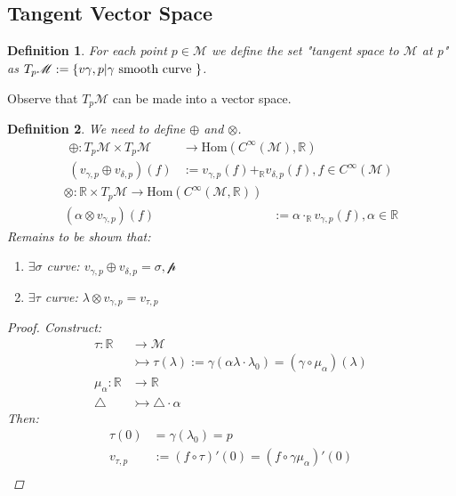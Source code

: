 \documentclass[10pt, oneside]{article}
\newcommand{\R}{\mathbb{R}}
\newcommand{\M}{\mathcal{M}}
\newtheorem{defn}{Definition}
\begin{document}
  \subsection{Tangent Vector Space}
     \begin{defn}
        For each point $p \in \M$ we define the set "tangent space to $\M$ at p" as $\\T_p \M := \{v{\gamma,p} | \gamma \text{ smooth curve } \}$.
     \end{defn}
     Observe that $T_p \M$ can be made into a vector space.
     \begin{defn}
        We need to define $\oplus$ and $\otimes$.
        \begin{align*}
           \oplus: T_p \M \times T_p \M &\to \text{Hom}(C^\infty(\M),\R) \\
           (v_{\gamma,p} \oplus v_{\delta,p})(f) &:= v_{\gamma,p}(f) +_{\R} v_{\delta,p} (f), f \in C^\infty (\M)
        \end{align*}
        \begin{align*}
           \otimes: \R \times T_p \M \to \text{Hom}(C^\infty(\M,\R)) \\
           (\alpha \otimes v_{\gamma,p})(f) &:= \alpha \cdot_{\R} v_{\gamma,p} (f), \alpha \in \R
        \end{align*}
        Remains to be shown that:
        \begin{enumerate}
           \item $\exists \sigma$ curve: $v_{\gamma,p} \oplus v_{\delta,p} = \mathcal{\sigma,p}$
           \item $\exists \tau$ curve: $\lambda \otimes v_{\gamma,p} = v_{\tau,p}$
        \end{enumerate}
        \begin{proof}
           Construct:
           \begin{align*}
              \tau: \R &\to \M \\
              &\rightarrowtail \tau(\lambda) := \gamma(\alpha \lambda \cdot \lambda_0) = (\gamma \circ \mu_{\alpha})(\lambda) \\
              \mu_\alpha: \R &\to \R \\
              \triangle &\rightarrowtail \triangle \cdot \alpha
           \end{align*}
           Then:
           \begin{align*}
              \tau (0) &= \gamma(\lambda_0) = p \\
              v_{\tau,p} &:= (f \circ \tau)'(0) = (f \circ \gamma \mu_\alpha)'(0) \\

\end{align*}
\end{proof}
\end{defn}
\end{document}
